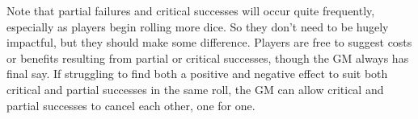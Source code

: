 Note that partial failures and critical successes will occur quite frequently, especially as players begin rolling more dice.
So they don't need to be hugely impactful, but they should make some difference.
Players are free to suggest costs or benefits resulting from partial or critical successes, though the GM always has final say.
If struggling to find both a positive and negative effect to suit both critical and partial successes in the same roll, the GM can allow critical and partial successes to cancel each other, one for one.
